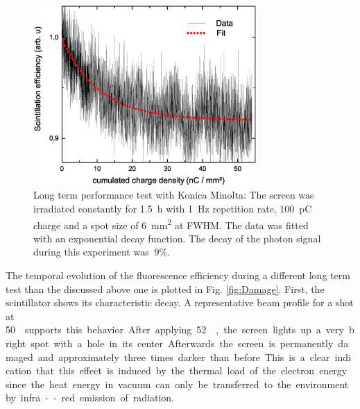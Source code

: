 \documentclass[%
reprint,
amsmath,
amssymb,
aip,
rsi, 
numerical,
floatfix,
]{revtex4-1}
\begin{document}
\begin{figure}
\includegraphics[width=8.5cm]{./Figures/Dt_Min_rel}%
\caption{\label{fig:Dt_Min_rel} Long term performance test with Konica Minolta: 
The screen was irradiated constantly for \SI{1.5}{\hour} with \SI{1}{\hertz} repetition rate, \SI{100}{\pico\coulomb} charge and a spot size of \SI{6}{\square\milli\meter} at FWHM. 
The data was fitted with an exponential decay function. 
The decay of the photon signal during this experiment was $~9\%$.}
\end{figure}

The temporal evolution of the fluorescence efficiency during a different long term test than the discussed above one is plotted in Fig. \ref{fig:Damage}.
First, the scintillator shows its characteristic decay. 
A representative beam profile for a shot at \SI[per-mode=symbol]{50}{\nano\coulomb \per \milli\meter\square}  supports this behavior.
After applying \SI[per-mode=symbol]{52}{\nano\coulomb \per \milli\meter\square}, the screen lights up a very bright spot with a hole in its center.
Afterwards the screen is permanently damaged and approximately three times darker than before.
This is a clear indication that this effect is induced by the thermal load of the electron energy since the heat energy in vacuum can only be transferred to the environment by infra--red emission of radiation.
\end{document}
